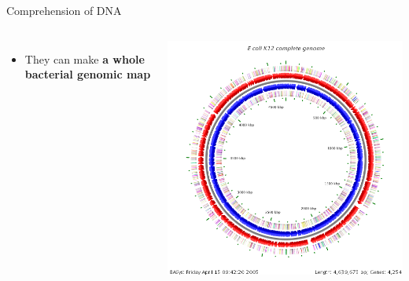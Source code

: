 \begin{frame}{Comprehension of DNA}
\footnotesize
    \begin{columns}[c] %
      \begin{itemize}
      \item They can make \textbf{a whole bacterial genomic map}
      \end{itemize} 
  
    \includegraphics[width=1.2\textwidth]{./images/BABsys2.png} 			
    \end{columns}
\end{frame}

